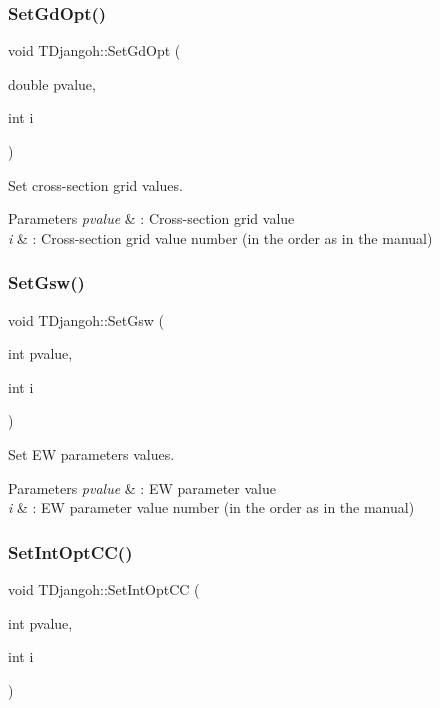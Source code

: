 \subsubsection{\texorpdfstring{Set\+Gd\+Opt()}{SetGdOpt()}}
{\footnotesize\ttfamily void T\+Djangoh\+::\+Set\+Gd\+Opt (\begin{DoxyParamCaption}\item[{double}]{pvalue,  }\item[{int}]{i }\end{DoxyParamCaption})}



Set cross-\/section grid values. 


\begin{DoxyParams}{Parameters}
{\em pvalue} & \+: Cross-\/section grid value \\
\hline
{\em i} & \+: Cross-\/section grid value number (in the order as in the manual) \\
\hline
\end{DoxyParams}
\mbox{\label{class_t_djangoh_acbd9827496878eed7768c97031a1c1d7}} 
\subsubsection{\texorpdfstring{Set\+Gsw()}{SetGsw()}}
{\footnotesize\ttfamily void T\+Djangoh\+::\+Set\+Gsw (\begin{DoxyParamCaption}\item[{int}]{pvalue,  }\item[{int}]{i }\end{DoxyParamCaption})}



Set EW parameters values. 


\begin{DoxyParams}{Parameters}
{\em pvalue} & \+: EW parameter value \\
\hline
{\em i} & \+: EW parameter value number (in the order as in the manual) \\
\hline
\end{DoxyParams}
\mbox{\label{class_t_djangoh_a7e37a7afc5c112a2bd061f5e73973f78}} 
\subsubsection{\texorpdfstring{Set\+Int\+Opt\+C\+C()}{SetIntOptCC()}}
{\footnotesize\ttfamily void T\+Djangoh\+::\+Set\+Int\+Opt\+CC (\begin{DoxyParamCaption}\item[{int}]{pvalue,  }\item[{int}]{i }\end{DoxyParamCaption})}



